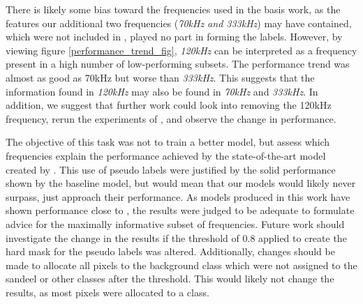     There is likely some bias toward the frequencies used in the basis work, as the features our additional two frequencies (\textit{70kHz and 333kHz}) may have contained, which were not included in \citet{brautaset2020acoustic}, played no part in forming the labels.  However, by viewing figure \ref{performance_trend_fig}, \textit{120kHz} can be interpreted as a frequency present in a high number of low-performing subsets. The performance trend was almost as good as 70kHz but worse than \textit{333kHz}. This suggests that the information found in \textit{120kHz} may also be found in \textit{70kHz} and \textit{333kHz}. In addition, we suggest that further work could look into removing the 120kHz frequency, rerun the experiments of \citet{brautaset2020acoustic}, and observe the change in performance. 
    
    
    The objective of this task was not to train a better model, but assess which frequencies explain the performance achieved by the state-of-the-art model created by \citet{brautaset2020acoustic}. This use of pseudo labels were justified by the solid performance shown by the baseline  model, but would mean that our models would likely never surpass, just approach their performance. As models produced in this work have shown performance close to \citeauthor{brautaset2020acoustic}, the results were judged to be adequate to formulate advice for the maximally informative subset of frequencies. Future work should investigate the change in the results if the threshold of 0.8 applied to create the hard mask for the pseudo labels was altered. Additionally, changes should be made to allocate all pixels to the background class which were not assigned to the sandeel or other classes after the threshold. This would likely not change the results, as most pixels were allocated to a class.
    
